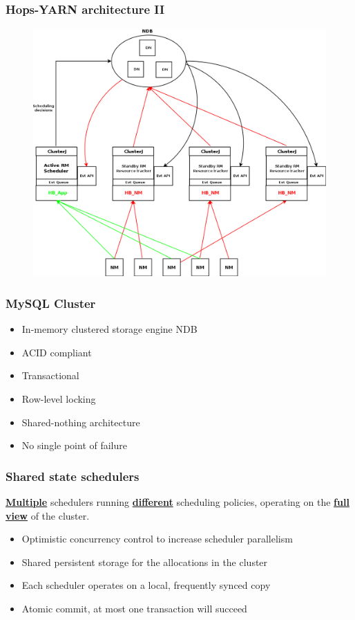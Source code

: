 \documentclass{beamer}
\begin{document}
\begin{frame}
\frametitle{Hops-YARN architecture II}

\begin{figure}
\centering
\includegraphics[scale=0.17]{resources/hopsyarn_arch_components.png}
\end{figure}
\end{frame}


\begin{frame}
\frametitle{MySQL Cluster}
\begin{itemize}
\item In-memory clustered storage engine NDB
\item ACID compliant
\item Transactional
\item Row-level locking
\item Shared-nothing architecture
\item No single point of failure
\end{itemize}
\end{frame}

\begin{frame}
\frametitle{Shared state schedulers}
\textbf{\underline{Multiple}} schedulers running \textbf{\underline{different}} scheduling
policies, operating on the \textbf{\underline{full view}} of the cluster.
\begin{itemize}
\item Optimistic concurrency control to increase scheduler parallelism
\item Shared persistent storage for the allocations in the cluster
\item Each scheduler operates on a local, frequently synced copy
\item Atomic commit, at most one transaction will succeed
\end{itemize}
\end{frame}
\end{document}
